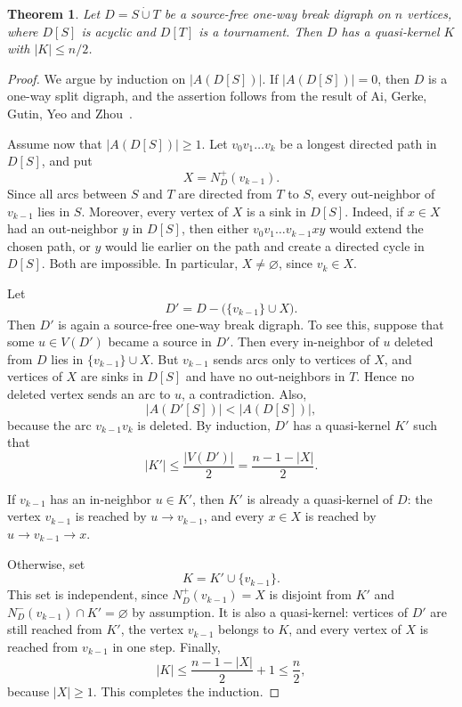 \documentclass[11pt,a4paper]{article}
\newtheorem{theorem}{Theorem}[section]
\begin{document}
\begin{theorem}\label{thm:one-way-break}
Let \(D=S\dot\cup T\) be a source-free one-way break digraph on \(n\) vertices,
where \(D[S]\) is acyclic and \(D[T]\) is a tournament. Then \(D\) has a
quasi-kernel \(K\) with \(|K|\le n/2\).
\end{theorem}

\begin{proof}
We argue by induction on \(|A(D[S])|\). If \(|A(D[S])|=0\), then \(D\) is a
one-way split digraph, and the assertion follows from the result of
Ai, Gerke, Gutin, Yeo and Zhou~\cite{AGGYZ}.

Assume now that \(|A(D[S])|\ge1\). Let \(v_0v_1\ldots v_k\) be a longest
directed path in \(D[S]\), and put
\[
    X=N_D^+(v_{k-1}).
\]
Since all arcs between \(S\) and \(T\) are directed from \(T\) to \(S\), every
out-neighbor of \(v_{k-1}\) lies in \(S\). Moreover, every vertex of \(X\) is a
sink in \(D[S]\). Indeed, if \(x\in X\) had an out-neighbor \(y\) in \(D[S]\),
then either \(v_0v_1\ldots v_{k-1}xy\) would extend the chosen path, or \(y\)
would lie earlier on the path and create a directed cycle in \(D[S]\). Both are
impossible. In particular, \(X\ne\varnothing\), since \(v_k\in X\).

Let
\[
    D'=D-\bigl(\{v_{k-1}\}\cup X\bigr).
\]
Then \(D'\) is again a source-free one-way break digraph. To see this, suppose
that some \(u\in V(D')\) became a source in \(D'\). Then every in-neighbor of
\(u\) deleted from \(D\) lies in \(\{v_{k-1}\}\cup X\). But \(v_{k-1}\) sends
arcs only to vertices of \(X\), and vertices of \(X\) are sinks in \(D[S]\) and
have no out-neighbors in \(T\). Hence no deleted vertex sends an arc to \(u\), a
contradiction. Also,
\[
    |A(D'[S])|<|A(D[S])|,
\]
because the arc \(v_{k-1}v_k\) is deleted. By induction, \(D'\) has a
quasi-kernel \(K'\) such that
\[
    |K'|\le \frac{|V(D')|}{2}=\frac{n-1-|X|}{2}.
\]

If \(v_{k-1}\) has an in-neighbor \(u\in K'\), then \(K'\) is already a
quasi-kernel of \(D\): the vertex \(v_{k-1}\) is reached by \(u\to v_{k-1}\),
and every \(x\in X\) is reached by \(u\to v_{k-1}\to x\).

Otherwise, set
\[
    K=K'\cup\{v_{k-1}\}.
\]
This set is independent, since \(N_D^+(v_{k-1})=X\) is disjoint from \(K'\) and
\(N_D^-(v_{k-1})\cap K'=\varnothing\) by assumption. It is also a quasi-kernel:
vertices of \(D'\) are still reached from \(K'\), the vertex \(v_{k-1}\) belongs
to \(K\), and every vertex of \(X\) is reached from \(v_{k-1}\) in one step.
Finally,
\[
    |K|\le \frac{n-1-|X|}{2}+1\le \frac n2,
\]
because \(|X|\ge1\). This completes the induction.
\end{proof}
\end{document}
